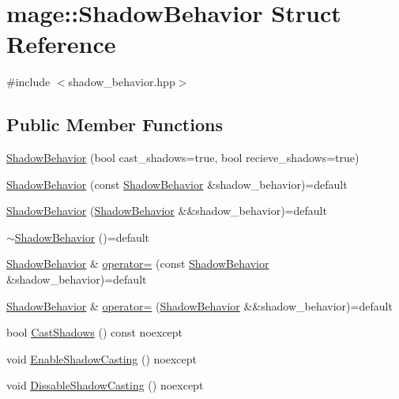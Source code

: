 \hypertarget{structmage_1_1_shadow_behavior}{}\section{mage\+:\+:Shadow\+Behavior Struct Reference}
\label{structmage_1_1_shadow_behavior}


{\ttfamily \#include $<$shadow\+\_\+behavior.\+hpp$>$}

\subsection*{Public Member Functions}
\begin{DoxyCompactItemize}
\item 
\hyperlink{structmage_1_1_shadow_behavior_ae4c778a02a208462d43641fa4fb10f34}{Shadow\+Behavior} (bool cast\+\_\+shadows=true, bool recieve\+\_\+shadows=true)
\item 
\hyperlink{structmage_1_1_shadow_behavior_aff1244f7a1d1cdb5e7541b3f85c5def1}{Shadow\+Behavior} (const \hyperlink{structmage_1_1_shadow_behavior}{Shadow\+Behavior} \&shadow\+\_\+behavior)=default
\item 
\hyperlink{structmage_1_1_shadow_behavior_a6178d9177c138b17bd81a744bfe878ed}{Shadow\+Behavior} (\hyperlink{structmage_1_1_shadow_behavior}{Shadow\+Behavior} \&\&shadow\+\_\+behavior)=default
\item 
\hyperlink{structmage_1_1_shadow_behavior_aa19b11ddd0b322cdc423031630d6f09a}{$\sim$\+Shadow\+Behavior} ()=default
\item 
\hyperlink{structmage_1_1_shadow_behavior}{Shadow\+Behavior} \& \hyperlink{structmage_1_1_shadow_behavior_afb38f4c5287418da2d0eb5c1cc06c33a}{operator=} (const \hyperlink{structmage_1_1_shadow_behavior}{Shadow\+Behavior} \&shadow\+\_\+behavior)=default
\item 
\hyperlink{structmage_1_1_shadow_behavior}{Shadow\+Behavior} \& \hyperlink{structmage_1_1_shadow_behavior_a28b03f100f172b7fee341bec449f966e}{operator=} (\hyperlink{structmage_1_1_shadow_behavior}{Shadow\+Behavior} \&\&shadow\+\_\+behavior)=default
\item 
bool \hyperlink{structmage_1_1_shadow_behavior_a37cfde9a881e2f233f8a30b06f5e22f6}{Cast\+Shadows} () const noexcept
\item 
void \hyperlink{structmage_1_1_shadow_behavior_ac8ca2e4c045206492c1ae55eefd46339}{Enable\+Shadow\+Casting} () noexcept
\item 
void \hyperlink{structmage_1_1_shadow_behavior_ad0b5b458bcc3fab7df549efc5b4bbd51}{Dissable\+Shadow\+Casting} () noexcept

\end{DoxyCompactItemize}
